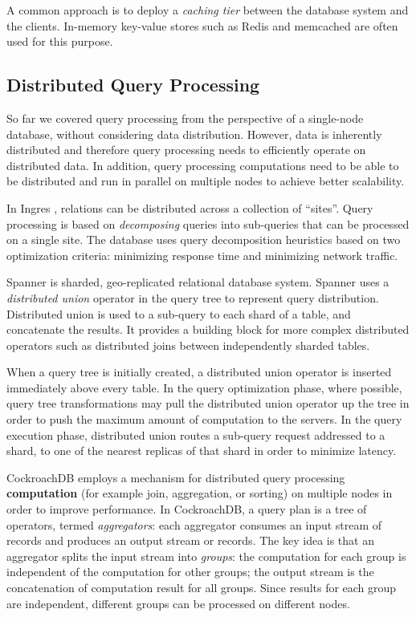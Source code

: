 A common approach is to deploy a \textit{caching tier} between the database system and the clients.
In-memory key-value stores such as Redis \cite{redis:cache} and memcached \cite{memcached:wiki} are often used for this
purpose.


\subsection{Distributed Query Processing}

So far we covered query processing from the perspective of a single-node database, without considering data distribution.
However, data is inherently distributed \cite{bacon:spanner, cockroachdb:docs} and therefore query processing needs to
efficiently operate on distributed data.
In addition, query processing computations need to be able to be distributed and run in parallel on multiple nodes to
achieve better scalability.

In Ingres \cite{epstein:ingres}, relations can be distributed across a collection of ``sites''.
Query processing is based on \textit{decomposing} queries into sub-queries that can be processed on a single site.
The database uses query decomposition heuristics based on two optimization criteria:
minimizing response time and minimizing network traffic.

Spanner \cite{bacon:spanner} is sharded, geo-replicated relational database system.
Spanner uses a \textit{distributed union} operator in the query tree to represent query distribution.
Distributed union is used to a sub-query to each shard of a table, and concatenate the results.
It provides a building block for more complex distributed operators such as distributed joins between independently
sharded tables.

When a query tree is initially created, a distributed union operator is inserted immediately above every table.
In the query optimization phase, where possible, query tree transformations may pull the distributed union operator up
the tree in order to push the maximum amount of computation to the servers.
In the query execution phase, distributed union routes a sub-query request addressed to a shard, to one of the nearest
replicas of that shard in order to minimize latency.

CockroachDB employs a mechanism for distributed query processing \textbf{computation} \cite{cockroachdb:distsql}
(for example join, aggregation, or sorting) on multiple nodes in order to improve performance.
In CockroachDB, a query plan is a tree of operators, termed \textit{aggregators}:
each aggregator consumes an input stream of records and produces an output stream or records.
The key idea is that an aggregator splits the input stream into \textit{groups}:
the computation for each group is independent of the computation for other groups; the output stream is the
concatenation of computation result for all groups.
Since results for each group are independent, different groups can be processed on different nodes.


